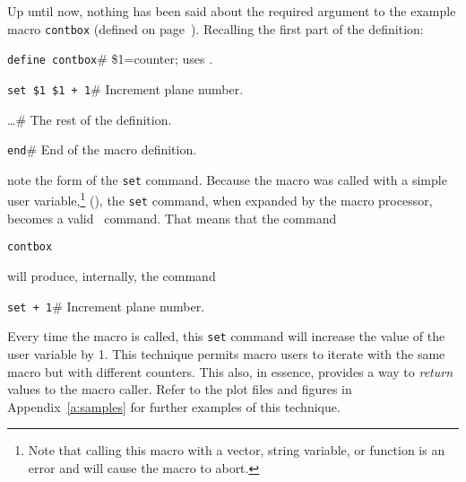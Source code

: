 Up until now, nothing has been said about the required
argument
to the example macro {\tt contbox} (defined on page~\pageref{e:contbox}).
Recalling the first part of the definition:
\begin{wiplist}%
  \item [\wipp] {\tt define contbox}\hfill\# \$1=counter; uses .
\samepage
  \item [\wipd] {\tt set \$1 \$1 + 1}\hfill\# Increment plane number.
  \item [\wipd] \ldots\hfill\# The rest of the definition.
  \item [\wipd] {\tt end}\hfill\# End of the macro definition.
\end{wiplist}
note the form of the {\tt set} command.
Because the macro was called with
a simple user variable,\footnote{Note that calling this macro with
a vector, string variable, or function
is an error and will cause the macro to abort.}
(), the {\tt set} command, when expanded by the macro processor,
becomes a valid \wip\ command.
That means that the command
\begin{wiplist}%
  \item {\tt contbox }
\end{wiplist}
will produce, internally, the command
\begin{wiplist}%
  \item {\tt set   + 1}\hfill\# Increment plane number.
\end{wiplist}
Every time the macro is called, this {\tt set} command
will increase the value of the user variable  by 1.
This technique permits macro users to iterate with the same macro but with
different counters.
This also, in essence, provides a way to
{\em return} values to the macro caller.
Refer to the plot files and figures in Appendix~\ref{a:samples}
for further examples of this technique.
